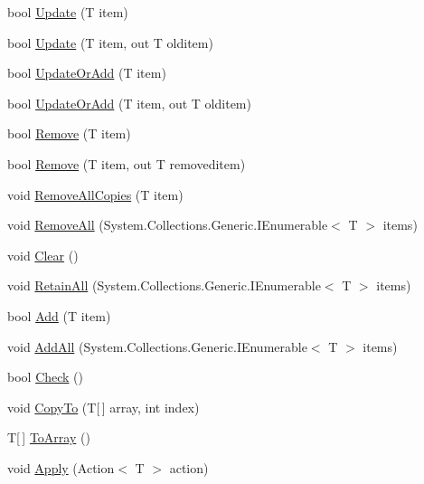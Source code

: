 \begin{DoxyCompactItemize}
\item 
bool \hyperlink{class_c5_1_1_wrapped_array_a7a72a3ce30888c5cd0b75cced3c1e241}{Update} (T item)
\item 
bool \hyperlink{class_c5_1_1_wrapped_array_a702abce4ea5ab27787f8b5f61598fc48}{Update} (T item, out T olditem)
\item 
bool \hyperlink{class_c5_1_1_wrapped_array_ade54ce5ee162ea128e492e98ba82b667}{Update\+Or\+Add} (T item)
\item 
bool \hyperlink{class_c5_1_1_wrapped_array_aadf783ba87fbad13d1730cd2c922ab7a}{Update\+Or\+Add} (T item, out T olditem)
\item 
bool \hyperlink{class_c5_1_1_wrapped_array_a3f312170b262e9f56b4d23442eb98029}{Remove} (T item)
\item 
bool \hyperlink{class_c5_1_1_wrapped_array_aeb6273eab4c6798ab5ae3f7d1b64dff1}{Remove} (T item, out T removeditem)
\item 
void \hyperlink{class_c5_1_1_wrapped_array_af733180804bf7ee5a4a0ece7f6cb12c3}{Remove\+All\+Copies} (T item)
\item 
void \hyperlink{class_c5_1_1_wrapped_array_a87989abbf2d41125036606805dcdd926}{Remove\+All} (System.\+Collections.\+Generic.\+I\+Enumerable$<$ T $>$ items)
\item 
void \hyperlink{class_c5_1_1_wrapped_array_aa57bfc8881b390314629e9830759eee5}{Clear} ()
\item 
void \hyperlink{class_c5_1_1_wrapped_array_aca9b3686c472517405451a8342da0de1}{Retain\+All} (System.\+Collections.\+Generic.\+I\+Enumerable$<$ T $>$ items)
\item 
bool \hyperlink{class_c5_1_1_wrapped_array_a5be2e0d6422cbc8597e1bc7571b41048}{Add} (T item)
\item 
void \hyperlink{class_c5_1_1_wrapped_array_aaebf1b158171f1848a486e71534e2ef8}{Add\+All} (System.\+Collections.\+Generic.\+I\+Enumerable$<$ T $>$ items)
\item 
bool \hyperlink{class_c5_1_1_wrapped_array_a9957618a31012883fca40898db85a504}{Check} ()
\item 
void \hyperlink{class_c5_1_1_wrapped_array_a3dfd50eb13f5b3f90445e217214fae96}{Copy\+To} (T\mbox{[}$\,$\mbox{]} array, int index)
\item 
T\mbox{[}$\,$\mbox{]} \hyperlink{class_c5_1_1_wrapped_array_a58fc7250416e58474a98d17a538fb9e2}{To\+Array} ()
\item 
void \hyperlink{class_c5_1_1_wrapped_array_a05225daca0b5a607afd5c049ca41da0b}{Apply} (Action$<$ T $>$ action)
\item 

\end{DoxyCompactItemize}
